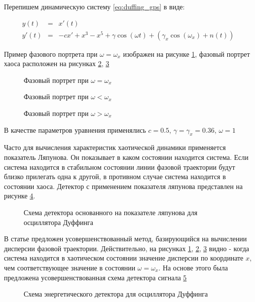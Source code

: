 Перепишем динамическую систему \ref{eq:duffing_gps} в виде:
\begin{center}
\begin{eqnarray}
	\label{eq:duffing_gps_2}
	y(t) & = & x'(t) \\
	y'(t) & = & -cx' + x^3 - x^5 + \gamma\cos(\omega{t}) + (\gamma_{x}\cos(\omega_{x}) + n(t))
\end{eqnarray}
\end{center}

Пример фазового портрета при ${\omega=\omega_{x}}$ изображен на рисунке \ref{pic:duffing_sync},
фазовый портрет хаоса расположен на рисунках \ref{pic:duffing_chaos1}, \ref{pic:duffing_chaos2}
\begin{figure}[H]
	\center{}
	\caption{Фазовый портрет при ${\omega =\omega_{x}}$}
	\label{pic:duffing_sync}
\end{figure}

\begin{figure}[H]
	\center{}
	\caption{Фазовый портрет при ${\omega < \omega_{x}}$}
	\label{pic:duffing_chaos1}
\end{figure}

\begin{figure}[H]
	\center{}
	\caption{Фазовый портрет при ${\omega > \omega_{x}}$}
	\label{pic:duffing_chaos2}
\end{figure}

В качестве параметров уравнения применялись $c = 0.5$, $\gamma=\gamma_{x}=0.36$, ${\omega=1}$

Часто для вычисления характеристик хаотической динамики применяется показатель Ляпунова.
Он показывает в каком состоянии находится система. Если система находится
в стабильном состоянии линии фазовой траектории будут близко прилегать одна к другой, в противном
случае система находится в состоянии хаоса. Детектор с применением показателя ляпунова
представлен на рисунке \ref{pic:chaos_lyapunov}.

\begin{figure}[H]
	\center{}
	\caption{Схема детектора основанного на показателе ляпунова для осциллятора Дуффинга}
	\label{pic:chaos_lyapunov}
\end{figure}

В статье \cite{chaos_chen} предложен усовершенствованный метод, базирующийся на вычислении дисперсии
фазовой траектории. Действительно, на рисунках \ref{pic:duffing_sync}, \ref{pic:duffing_chaos1},
\ref{pic:duffing_chaos2} видно - когда система находится в хаотическом состоянии значение
дисперсии по координате ${x}$, чем соответствующее значение в состоянии $\omega = \omega_{x}$.
На основе этого была предложена усовершенствованная схема детектора сигнала
\ref{pic:chaos_energy_detector}

\begin{figure}[H]
	\center{}
	\caption{Схема энергетического детектора для осциллятора Дуффинга}
	\label{pic:chaos_energy_detector}
\end{figure}

\newpage
